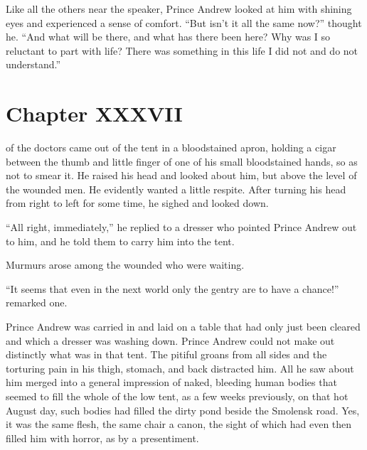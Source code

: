 Like all the others near the speaker, Prince Andrew looked at him
with shining eyes and experienced a sense of comfort. ``But isn't
it all the same now?'' thought he. ``And what will be there, and
what has there been here? Why was I so reluctant to part with
life? There was something in this life I did not and do not
understand.''


\chapter*{Chapter XXXVII} \ifaudio {}
\fi

 of the doctors came out of the tent in a bloodstained apron,
holding a cigar between the thumb and little finger of one of his
small bloodstained hands, so as not to smear it. He raised his
head and looked about him, but above the level of the wounded
men. He evidently wanted a little respite. After turning his head
from right to left for some time, he sighed and looked down.

``All right, immediately,'' he replied to a dresser who pointed
Prince Andrew out to him, and he told them to carry him into the
tent.

Murmurs arose among the wounded who were waiting.

``It seems that even in the next world only the gentry are to
have a chance!'' remarked one.

Prince Andrew was carried in and laid on a table that had only
just been cleared and which a dresser was washing down. Prince
Andrew could not make out distinctly what was in that tent. The
pitiful groans from all sides and the torturing pain in his
thigh, stomach, and back distracted him. All he saw about him
merged into a general impression of naked, bleeding human bodies
that seemed to fill the whole of the low tent, as a few weeks
previously, on that hot August day, such bodies had filled the
dirty pond beside the Smolensk road. Yes, it was the same flesh,
the same chair a canon, the sight of which had even then filled
him with horror, as by a presentiment.

